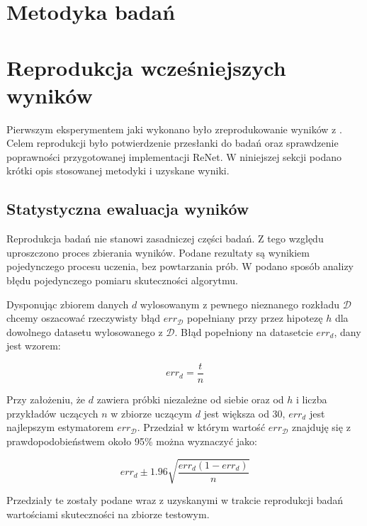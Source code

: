 \documentclass[oneside, mag]{mgr}
\begin{document}
\section{Metodyka badań}

\section{Reprodukcja wcześniejszych wyników}

Pierwszym eksperymentem jaki wykonano było zreprodukowanie wyników z \cite{DBLP:journals/corr/VisinKCMCB15}. Celem reprodukcji było potwierdzenie przesłanki do badań oraz sprawdzenie poprawności przygotowanej implementacji ReNet. W niniejszej sekcji podano krótki opis stosowanej metodyki i uzyskane wyniki.

\subsection{Statystyczna ewaluacja wyników}

Reprodukcja badań nie stanowi zasadniczej części badań. Z tego względu uproszczono proces zbierania wyników. Podane rezultaty są wynikiem pojedynczego procesu uczenia, bez powtarzania prób. W \cite{tom-mitchell-machine-learning} podano sposób analizy błędu pojedynczego pomiaru skuteczności algorytmu.

Dysponując zbiorem danych $d$ wylosowanym z pewnego nieznanego rozkładu $\mathcal{D}$ chcemy oszacować rzeczywisty błąd $err_{\mathcal{D}}$ popełniany przy przez hipotezę $h$ dla dowolnego datasetu wylosowanego z $\mathcal{D}$. Błąd popełniony na datasetcie $err_d$, dany jest wzorem:

\begin{equation}
	err_d = \frac{t}{n}
\end{equation}

Przy założeniu, że $d$ zawiera próbki niezależne od siebie oraz od $h$ i liczba przykładów uczących $n$ w zbiorze uczącym $d$ jest większa od 30, $err_d$ jest najlepszym estymatorem $err_{\mathcal{D}}$. Przedział w którym wartość $err_{\mathcal{D}}$ znajduję się z prawdopodobieństwem około 95\% można wyznaczyć jako:

\begin{equation}
	err_{d} \pm 1.96 \sqrt{\frac{err_{d}(1 - err_{d})}{n}} 
\end{equation}

Przedziały te zostały podane wraz z uzyskanymi w trakcie reprodukcji badań wartościami skuteczności na zbiorze testowym.
\end{document}
